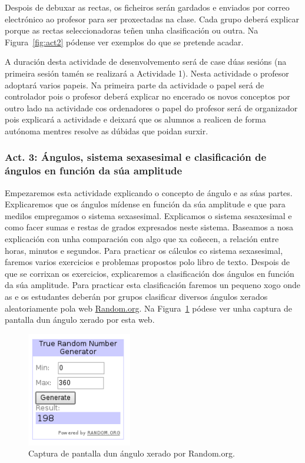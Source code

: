 Despois de debuxar as rectas, os ficheiros serán gardados e enviados por correo electrónico ao profesor para ser proxectadas na clase. Cada grupo deberá explicar porque as rectas seleccionadoras teñen unha clasificación ou outra. Na Figura~\ref{fig:act2} pódense ver exemplos do que se pretende acadar.

A duración desta actividade de desenvolvemento será de case dúas sesións (na primeira sesión tamén se realizará a Actividade 1). Nesta actividade o profesor adoptará varios papeis. Na primeira parte da actividade o papel será de controlador pois o profesor deberá explicar no encerado os novos conceptos por outro lado na actividade cos ordenadores o papel do profesor será de organizador pois explicará a actividade e deixará que os alumnos a realicen de forma autónoma mentres resolve as dúbidas que poidan surxir.

\subsubsection{Act. 3: Ángulos, sistema sexasesimal e clasificación de ángulos en función da súa amplitude}\label{act:angulos}
Empezaremos esta actividade explicando o concepto de ángulo e as súas partes. Explicaremos que os ángulos mídense en función da súa amplitude e que para medilos empregamos o sistema sexasesimal. Explicamos o sistema sesaxesimal e como facer sumas e restas de grados expresados neste sistema. Baseamos a nosa explicación con unha comparación con algo que xa coñecen, a relación entre horas, minutos e segundos. Para practicar os cálculos co sistema sexasesimal, faremos varios exercicios e problemas propostos polo libro de texto. Despois de que se corrixan os exercicios, explicaremos a clasificación dos ángulos en función da súa amplitude. Para practicar esta clasificación faremos un pequeno xogo onde as e os estudantes deberán por grupos clasificar diversos ángulos xerados aleatoriamente pola web \href{http://random.org}{Random.org}. Na Figura~\ref{fig:act5} pódese ver unha captura de pantalla dun ángulo xerado por esta web.


\begin{figure}[h!]
  \centering
  \includegraphics[height=5cm]{img/random.png}
  \caption{Captura de pantalla dun ángulo xerado por Random.org.}\label{fig:act5}
\end{figure}

